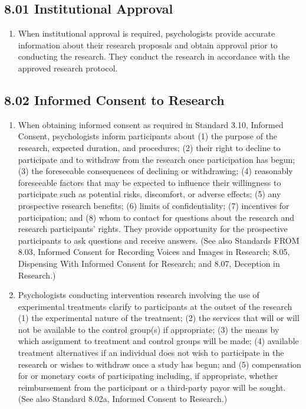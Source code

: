 \subsection{8.01 Institutional Approval}

\begin{enumerate}

\item When institutional approval is required, psychologists provide accurate information about their research proposals and obtain approval prior to conducting the research. They conduct the research in accordance with the approved research protocol.

\end{enumerate}



\subsection{8.02 Informed Consent to Research}

\begin{enumerate}

\item When obtaining informed consent as required in Standard 3.10, Informed Consent, psychologists inform participants about (1) the purpose of the research, expected duration, and procedures; (2) their right to decline to participate and to withdraw from the research once participation has begun; (3) the foreseeable consequences of declining or withdrawing; (4) reasonably foreseeable factors that may be expected to influence their willingness to participate such as potential risks, discomfort, or adverse effects; (5) any prospective research benefits; (6) limits of confidentiality; (7) incentives for participation; and (8) whom to contact for questions about the research and research participants' rights. They provide opportunity for the prospective participants to ask questions and receive answers. (See also Standards
FROM
8.03, Informed Consent for Recording Voices and Images in Research; 8.05, Dispensing With Informed Consent for Research; and 8.07, Deception in Research.)

\item Psychologists conducting intervention research involving the use of experimental treatments clarify to participants at the outset of the research (1) the experimental nature of the treatment; (2) the services that will or will not be available to the control group(s) if appropriate; (3) the means by which assignment to treatment and control groups will be made; (4) available treatment alternatives if an individual does not wish to participate in the research or wishes to withdraw once a study has begun; and (5) compensation for or monetary costs of participating including, if appropriate, whether reimbursement from the participant or a third-party payor will be sought. (See also Standard 8.02a, Informed Consent to Research.)

\end{enumerate}


